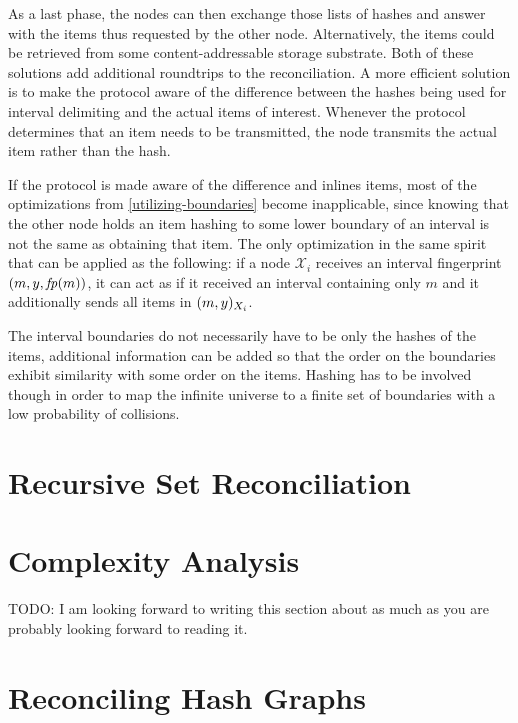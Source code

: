 As a last phase, the nodes can then exchange those lists of hashes and answer with the items thus requested by the other node. Alternatively, the items could be retrieved from some content-addressable storage substrate. Both of these solutions add additional roundtrips to the reconciliation. A more efficient solution is to make the protocol aware of the difference between the hashes being used for interval delimiting and the actual items of interest. Whenever the protocol determines that an item needs to be transmitted, the node transmits the actual item rather than the hash.

If the protocol is made aware of the difference and inlines items, most of the optimizations from \cref{utilizing-boundaries} become inapplicable, since knowing that the other node holds an item hashing to some lower boundary of an interval is not the same as obtaining that item. The only optimization in the same spirit that can be applied as the following: if a node $\mathcal{X}_i$ receives an interval fingerprint $({m}, {y}, {\mathit{fp}(m)})$, it can act as if it received an interval containing only $m$ and it additionally sends all items in $({m},{y})_{X_i}$.

The interval boundaries do not necessarily have to be only the hashes of the items, additional information can be added so that the order on the boundaries exhibit similarity with some order on the items. Hashing has to be involved though in order to map the infinite universe to a finite set of boundaries with a low probability of collisions.

\section{Recursive Set Reconciliation}
\label{set-reconciliation-def}

\section{Complexity Analysis}
\label{set-reconciliation-complexity}

TODO: I am looking forward to writing this section about as much as you are probably looking forward to reading it. 

\section{Reconciling Hash Graphs}
\label{set-reconciliation-simple-graphs}
